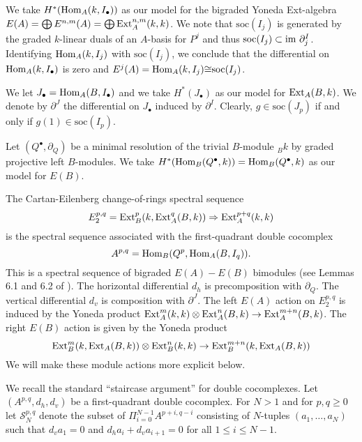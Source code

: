 \documentclass[11pt,righttag]{amsart}
\begin{document}
We take $H^*({\hbox{Hom}}_A(k,I_{\bullet}))$ as our model for the bigraded Yoneda Ext-algebra $E(A)=\bigoplus E^{n,m}(A)=\bigoplus{\hbox{{\rm Ext}}}_A^{n,m}(k,k)$.  We note that ${\text{soc}}(I_j)$ is generated by the graded $k$-linear duals of an $A$-basis for $P^j$ and thus ${\text{soc}}(I_j)\subset {\hbox{im}}\ \partial_j^I$. Identifying ${\hbox{Hom}}_A(k,I_j)$ with ${\text{soc}}(I_j)$, we conclude that the differential on ${\hbox{Hom}}_A(k,I_{\bullet})$ is zero and $E^j(A)={\hbox{Hom}}_A(k,I_j){\cong} {\text{soc}}(I_j)$.

We let $J_{\bullet}={\hbox{Hom}}_A(B,I_{\bullet})$ and we take $H^*(J_{\bullet})$ as our model for ${\hbox{{\rm Ext}}}_A(B,k)$. We denote  by $\partial^J$ the differential on $J_{\bullet}$ induced by $\partial^I$. Clearly, $g\in{\text{soc}}(J_p)$ if and only if $g(1)\in{\text{soc}}(I_p)$.

Let $(Q^{\bullet},{\partial_Q})$ be a minimal resolution of the trivial $B$-module $_Bk$ by graded projective left $B$-modules. We take $H^*({\hbox{Hom}}_B(Q^{\bullet},k))={\hbox{Hom}}_B(Q^{\bullet},k)$ as our model for $E(B)$.

The Cartan-Eilenberg change-of-rings spectral sequence
$$E_2^{p,q}={\hbox{{\rm Ext}}}_B^p(k,{\hbox{{\rm Ext}}}_A^q(B,k))\Rightarrow {\hbox{{\rm Ext}}}_A^{p+q}(k,k)$$
 is the spectral sequence associated with the first-quadrant double cocomplex
 $$A^{p,q}={\hbox{Hom}}_B(Q^p,{\hbox{Hom}}_A(B,I_q)).$$
 This is a spectral sequence of bigraded $E(A)-E(B)$ bimodules (see Lemmas 6.1 and 6.2 of \cite{CS}).  The horizontal differential $d_h$ is precomposition with $\partial_Q$. The vertical differential $d_v$ is  composition with $\partial^J$. The left $E(A)$ action on $E_2^{p,q}$ is induced by the Yoneda product ${\hbox{{\rm Ext}}}_A^m(k,k)\otimes{\hbox{{\rm Ext}}}_A^n(B,k)\rightarrow {\hbox{{\rm Ext}}}_A^{m+n}(B,k)$. The right $E(B)$ action is given by the Yoneda product $${\hbox{{\rm Ext}}}_B^m(k,{\hbox{{\rm Ext}}}_A(B,k))\otimes {\hbox{{\rm Ext}}}_B^n(k,k)\rightarrow {\hbox{{\rm Ext}}}_B^{m+n}(k,{\hbox{{\rm Ext}}}_A(B,k))$$
 We will make these module actions more explicit below.
 
 We recall the standard ``staircase argument'' for double cocomplexes. Let $(A^{p,q},d_h,d_v)$ be a first-quadrant double cocomplex. For $N>1$ and for $p,q\ge 0$ let
 ${\mathcal S}_N^{p,q}$ denote the subset of $\Pi_{i=0}^{N-1} A^{p+i,q-i}$ consisting of $N$-tuples $(a_1,\ldots, a_N)$ such that $d_va_1=0$ and  $d_ha_i+d_va_{i+1}=0$ for all  $1\le i\le N-1$.
 
\end{document}
